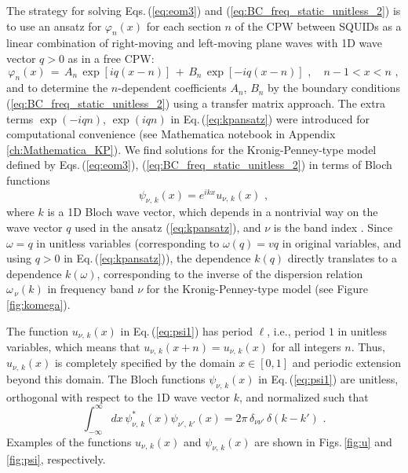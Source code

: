 The strategy for solving Eqs.\,(\ref{eq:eom3}) and (\ref{eq:BC_freq_static_unitless_2}) 
is to use an ansatz for $\varphi_n(x)$ for each section $n$ of the CPW
between SQUIDs as a linear combination of right-moving
and left-moving plane waves with 1D wave vector $q>0$ as in a free CPW:
%
\begin{equation} \label{eq:kpansatz}
\varphi_n(x) \, = \, A_n \, \exp\left[i q (x-n) \right] \, + \, 
B_n \, \exp\left[-i q (x-n) \right] \, \, , \quad n-1 < x < n \, \, ,
\end{equation}
%
and to determine the $n$-dependent coefficients $A_n$, $B_n$ by the boundary conditions 
(\ref{eq:BC_freq_static_unitless_2}) using a transfer matrix approach.
The extra terms $\exp(- i q n)$, $\exp(i q n)$ in Eq.\,(\ref{eq:kpansatz}) were introduced 
for computational convenience  (see Mathematica notebook in Appendix \ref{ch:Mathematica_KP}).
%
We find solutions for the Kronig-Penney-type model defined by 
Eqs.\,(\ref{eq:eom3}), (\ref{eq:BC_freq_static_unitless_2})
in terms of Bloch functions
%
\begin{equation} \label{eq:psi1}
\psi_{\nu,\,k}(x) = e^{i k x} u_{\nu,\,k}(x) \, \, ,   
\end{equation}
%
where $k$ is a 1D Bloch wave vector, which depends in a nontrivial way on the wave vector $q$ used in the ansatz (\ref{eq:kpansatz}), and $\nu$ is the band index \cite{Ashcroft1976}.
Since $\omega = q$ in unitless variables (corresponding to $\omega(q) = v q$ in original variables,
and using $q>0$ in Eq.\,(\ref{eq:kpansatz})),
the dependence $k(q)$ directly translates to a dependence $k(\omega)$, corresponding to the 
inverse of the dispersion relation $\omega_{\,\nu}(k)$ in frequency band $\nu$ for the Kronig-Penney-type model (see Figure \ref{fig:komega}).

The function  $u_{\nu,\,k}(x)$ in Eq.\,(\ref{eq:psi1}) has period $\ell$, i.e., 
period $1$ in unitless variables, which means that
$u_{\nu,\,k}(x + n) = u_{\nu,\,k}(x)$ for all integers $n$. 
Thus, $u_{\nu,\,k}(x)$ is completely specified by the domain $x \in [0,1]$ 
and periodic extension beyond this domain.
The Bloch functions $\psi_{\nu,\,k}(x)$ in Eq.\,(\ref{eq:psi1})
are unitless, orthogonal with respect to the 1D wave vector $k$, and normalized such that
%
\begin{equation} \label{eq:psi1_norm_orig}
\int_{-\infty}^{\infty} dx \, \psi^*_{\nu,\,k}(x) \psi_{\nu',\,k'}(x) = 2 \pi \, \delta_{\nu \nu'} \, \delta(k - k') \, \, .
\end{equation}
%
Examples of the functions $u_{\nu,\,k}(x)$ and $\psi_{\nu,\,k}(x)$
are shown in Figs.\,\ref{fig:u} and \ref{fig:psi}, respectively. 

